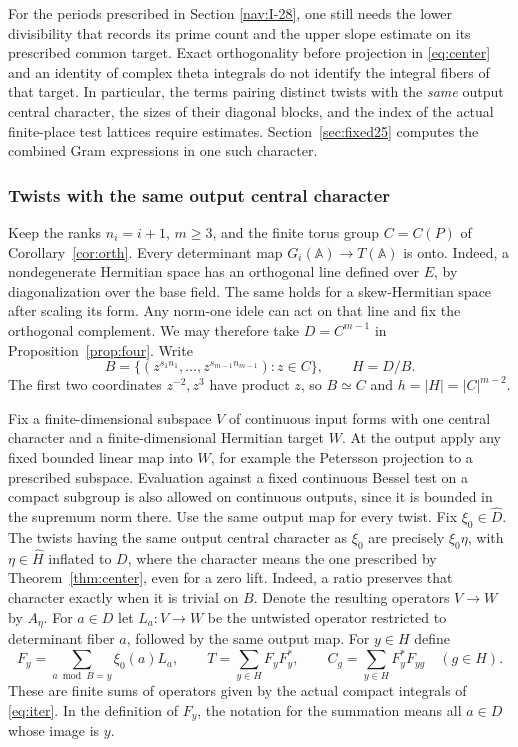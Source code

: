 \documentclass[a4paper,11pt]{article}
\theoremstyle{definition}
\theoremstyle{remark}
\numberwithin{equation}{section}
\begin{document}
For the periods prescribed in Section \ref{nav:I-28}, one still needs the lower divisibility that records its prime count and the upper slope estimate on its prescribed common target. Exact orthogonality before projection in \eqref{eq:center} and an identity of complex theta integrals do not identify the integral fibers of that target. In particular, the terms pairing distinct twists with the \emph{same} output central character, the sizes of their diagonal blocks, and the index of the actual finite-place test lattices require estimates. Section~\ref{sec:fixed25} computes the combined Gram expressions in one such character.

\subsubsection{Twists with the same output central character}\label{nav:I-43}
\label{sec:fixed25}

Keep the ranks \(n_i=i+1\), \(m\ge3\), and the finite torus group \(C=C(P)\) of Corollary~\ref{cor:orth}. Every determinant map \(G_i(\mathbb A)\to T(\mathbb A)\) is onto. Indeed, a nondegenerate Hermitian space has an orthogonal line defined over \(E\), by diagonalization over the base field. The same holds for a skew-Hermitian space after scaling its form. Any norm-one idele can act on that line and fix the orthogonal complement. We may therefore take \(D=C^{m-1}\) in Proposition~\ref{prop:four}. Write
\[
  B=\{(z^{s_1 n_1},\ldots,z^{s_{m-1}n_{m-1}}):z\in C\},\qquad H=D/B .
\]
The first two coordinates \(z^{-2},z^3\) have product \(z\), so \(B\simeq C\) and \(h=|H|=|C|^{m-2}\).

Fix a finite-dimensional subspace \(V\) of continuous input forms with one central character and a finite-dimensional Hermitian target \(W\). At the output apply any fixed bounded linear map into \(W\), for example the Petersson projection to a prescribed subspace. Evaluation against a fixed continuous Bessel test on a compact subgroup is also allowed on continuous outputs, since it is bounded in the supremum norm there. Use the same output map for every twist. Fix \(\xi_0\in\widehat D\). The twists having the same output central character as \(\xi_0\) are precisely \(\xi_0\eta\), with \(\eta\in\widehat H\) inflated to \(D\), where the character means the one prescribed by Theorem~\ref{thm:center}, even for a zero lift. Indeed, a ratio preserves that character exactly when it is trivial on \(B\). Denote the resulting operators \(V\to W\) by \(A_\eta\). For \(a\in D\) let \(L_a:V\to W\) be the untwisted operator restricted to determinant fiber \(a\), followed by the same output map. For \(y\in H\) define
\[
        F_y=\sum_{a\bmod B=y}\xi_0(a)L_a,\qquad
        T=\sum_{y\in H} F_yF_y^*,\qquad
        C_g=\sum_{y\in H}F_y^*F_{yg}\quad(g\in H).
\]
These are finite sums of operators given by the actual compact integrals of \eqref{eq:iter}. In the definition of \(F_y\), the notation for the summation means all \(a\in D\) whose image is \(y\).
\end{document}

